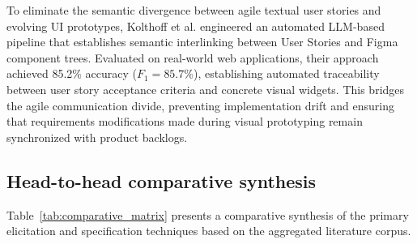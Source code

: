 To eliminate the semantic divergence between agile textual user stories and evolving UI prototypes, Kolthoff et al. \cite{kolthoff2024interlinking} engineered an automated LLM-based pipeline that establishes semantic interlinking between User Stories and Figma component trees. Evaluated on real-world web applications, their approach achieved 85.2\% accuracy ($F_1 = 85.7\%$), establishing automated traceability between user story acceptance criteria and concrete visual widgets. This bridges the agile communication divide, preventing implementation drift and ensuring that requirements modifications made during visual prototyping remain synchronized with product backlogs.

\subsection{Head-to-head comparative synthesis}
Table~\ref{tab:comparative_matrix} presents a comparative synthesis of the primary elicitation and specification techniques based on the aggregated literature corpus.

